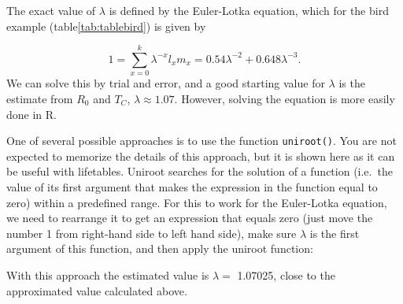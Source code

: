 \documentclass[
]{book}
\newenvironment{Shaded}{\begin{snugshade}}{\end{snugshade}}
\newcommand{\AttributeTok}[1]{\textcolor[rgb]{0.77,0.63,0.00}{#1}}
\newcommand{\CommentTok}[1]{\textcolor[rgb]{0.56,0.35,0.01}{\textit{#1}}}
\newcommand{\ControlFlowTok}[1]{\textcolor[rgb]{0.13,0.29,0.53}{\textbf{#1}}}
\newcommand{\DecValTok}[1]{\textcolor[rgb]{0.00,0.00,0.81}{#1}}
\newcommand{\FunctionTok}[1]{\textcolor[rgb]{0.00,0.00,0.00}{#1}}
\newcommand{\NormalTok}[1]{#1}
\newcommand{\OtherTok}[1]{\textcolor[rgb]{0.56,0.35,0.01}{#1}}
\newcommand{\SpecialCharTok}[1]{\textcolor[rgb]{0.00,0.00,0.00}{#1}}
\begin{document}
The exact value of \(\lambda\) is defined by the Euler-Lotka equation, which for the bird example (table\ref{tab:tablebird}) is given by

\[
1=\sum_{x=0}^{k}\lambda^{-x}l_xm_x=0.54\lambda^{-2}+0.648\lambda^{-3}.
\]
We can solve this by trial and error, and a good starting value for \(\lambda\) is the estimate from \(R_0\) and \(T_C\), \(\lambda \approx1.07\). However, solving the equation is more easily done in R.

One of several possible approaches is to use the function \texttt{uniroot()}. You are not expected to memorize the details of this approach, but it is shown here as it can be useful with lifetables. Uniroot searches for the solution of a function (i.e.~the value of its first argument that makes the expression in the function equal to zero) within a predefined range. For this to work for the Euler-Lotka equation, we need to rearrange it to get an expression that equals zero (just move the number 1 from right-hand side to left hand side), make sure \(\lambda\) is the first argument of this function, and then apply the uniroot function:

\begin{Shaded}
\end{Shaded}

With this approach the estimated value is \(\lambda=\) 1.07025, close to the approximated value calculated above.
\end{document}
